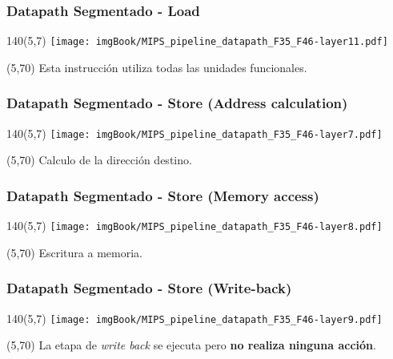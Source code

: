 \documentclass[aspectratio=169]{beamer}
\begin{document}
\begin{frame}[t,fragile]
    \frametitle{Datapath Segmentado - Load}
    \begin{textblock}{140}(5,7) \texttt{[image: imgBook/MIPS\_pipeline\_datapath\_F35\_F46-layer11.pdf]} \end{textblock}
    \begin{textblock}{38}(5,70) \footnotesize
    Esta instrucción utiliza todas las unidades funcionales.
    \end{textblock}
\end{frame}

\begin{frame}[t,fragile]
    \frametitle{Datapath Segmentado - Store \large (Address calculation)}
    \begin{textblock}{140}(5,7) \texttt{[image: imgBook/MIPS\_pipeline\_datapath\_F35\_F46-layer7.pdf]} \end{textblock}
    \begin{textblock}{30}(5,70) \footnotesize
    Calculo de la dirección destino.
    \end{textblock}
\end{frame}

\begin{frame}[t,fragile]
    \frametitle{Datapath Segmentado - Store \large (Memory access)}
    \begin{textblock}{140}(5,7) \texttt{[image: imgBook/MIPS\_pipeline\_datapath\_F35\_F46-layer8.pdf]} \end{textblock}
    \begin{textblock}{30}(5,70) \footnotesize
    Escritura a memoria.
    \end{textblock}
\end{frame}

\begin{frame}[t,fragile]
    \frametitle{Datapath Segmentado - Store \large (Write-back)}
    \begin{textblock}{140}(5,7) \texttt{[image: imgBook/MIPS\_pipeline\_datapath\_F35\_F46-layer9.pdf]} \end{textblock}
    \begin{textblock}{30}(5,70) \footnotesize
    \textcolor{verdeuca}{La etapa de \emph{write back} se ejecuta pero \textbf{no realiza ninguna acción}.}
    \end{textblock}
\end{frame}
\end{document}
